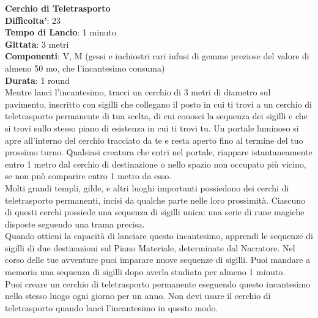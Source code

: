 \begin{multicols}{2}
\medskip\textbf{Cerchio di Teletrasporto}\\
\textbf{Difficolta'}: 23\\
\textbf{Tempo di Lancio}: 1 minuto\\
\textbf{Gittata}: 3 metri\\
\textbf{Componenti}: V, M (gessi e inchiostri rari infusi di gemme preziose del valore di almeno 50 mo, che l’incantesimo consuma)\\
\textbf{Durata}: 1 round\\
Mentre lanci l’incantesimo, tracci un cerchio di 3 metri di diametro sul pavimento, inscritto con sigilli che collegano il posto in cui ti trovi a un cerchio di teletrasporto permanente di tua scelta, di cui conosci la sequenza dei sigilli e che si trovi sullo stesso piano di esistenza in cui ti trovi tu. Un portale luminoso si apre all’interno del cerchio tracciato da te e resta aperto fino al termine del tuo prossimo turno. Qualsiasi creatura che entri nel portale, riappare istantaneamente entro 1 metro dal cerchio di destinazione o nello spazio non
occupato più vicino, se non può comparire entro 1 metro da esso.\\
Molti grandi templi, gilde, e altri luoghi importanti possiedono dei cerchi di teletrasporto permanenti, incisi da qualche parte nelle loro prossimità. Ciascuno di questi cerchi possiede una sequenza di sigilli unica: una serie di rune magiche disposte seguendo una trama precisa.\\ Quando ottieni la capacità di lanciare questo incantesimo, apprendi le sequenze di sigilli di
due destinazioni sul Piano Materiale, determinate dal Narratore. Nel corso delle tue avventure puoi imparare nuove sequenze di sigilli. Puoi mandare a memoria una sequenza di sigilli dopo averla studiata per almeno 1 minuto.\\
Puoi creare un cerchio di teletrasporto permanente eseguendo questo incantesimo nello stesso luogo ogni giorno per un anno. Non devi usare il cerchio di teletrasporto quando lanci l’incantesimo in questo modo.


\end{multicols}
